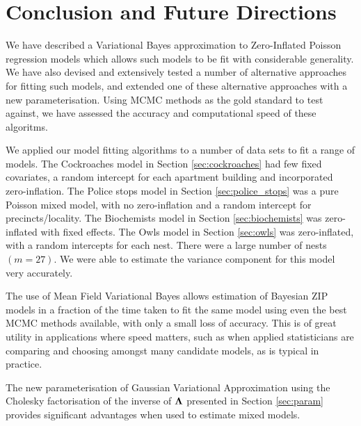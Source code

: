 \chapter{Conclusion and Future Directions}
\label{sec:chapter_2_conclusion}
		
We have described a Variational Bayes approximation to Zero-Inflated Poisson
regression models which allows such models to be fit with considerable
generality. We have also devised and extensively tested a number of alternative
approaches for fitting such models, and extended one of these alternative
approaches with a new parameterisation. Using MCMC methods as the gold standard
to test against, we have assessed the accuracy and computational speed of these
algoritms.
		
We applied our model fitting algorithms to a number of data sets to fit a range
of models. The Cockroaches model in Section \ref{sec:cockroaches} had few fixed
covariates, a random intercept for each apartment building and incorporated
zero-inflation. The Police stops model in Section \ref{sec:police_stops} was a
pure Poisson mixed model, with no zero-inflation and a random intercept for
precincts/locality. The Biochemists model in Section \ref{sec:biochemists} was
zero-inflated with fixed effects. The Owls model in Section \ref{sec:owls} was
zero-inflated,  with a random intercepts for each nest. There were a large
number of nests $(m=27)$. We were able to estimate the variance component for
this model very accurately.

The use of Mean Field Variational Bayes allows estimation of Bayesian ZIP
models in a fraction of the time taken to fit the same model using even the
best MCMC methods available, with only a small loss of accuracy. This is of
great utility in applications where speed matters, such as when applied
statisticians are comparing and choosing amongst many candidate models, as is
typical in practice.
		
The new parameterisation of Gaussian Variational Approximation using the
Cholesky factorisation of the inverse of ${\boldsymbol \Lambda}$ presented in Section
\ref{sec:param} provides significant advantages when used to estimate mixed
models.

